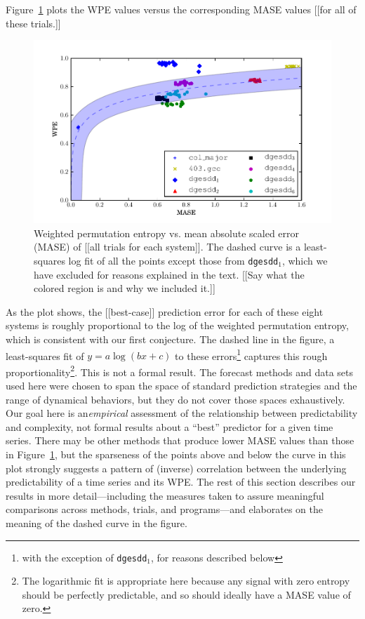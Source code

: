 Figure~\ref{fig:wpe_vs_mase_best} plots the WPE values versus the
corresponding MASE values [[for all of these trials.]]
\begin{figure}[htbp]
  \centering
  \includegraphics[width=\columnwidth]{figs/new_prediction_vs_entropy_autolog}
  \caption{Weighted permutation entropy vs. mean absolute scaled error
    (MASE) of [[all trials for each system]].
%
%
The dashed curve is a least-squares log fit of all the points except
those from {\tt dgesdd$_1$}, which we have excluded for reasons
explained in the text.  [[Say what the colored region is and why we
    included it.]]}
  \label{fig:wpe_vs_mase_best}
\end{figure}
As the plot shows, the [[best-case]] prediction error for each of
these eight systems is roughly proportional to the log of the weighted
permutation entropy, which is consistent with our first conjecture.
The dashed line in the figure, a least-squares fit of $y = a \log(b x
+ c)$ to these errors\footnote{with the exception of {\tt dgesdd$_1$},
  for reasons described below} captures this rough
proportionality\footnote{The logarithmic fit is appropriate here
  because any signal with zero entropy should be perfectly
  predictable, and so should ideally have a MASE value of zero.}.
This is not a formal result.  The forecast methods and data sets used
here were chosen to span the space of standard prediction strategies
and the range of dynamical behaviors, but they do not cover those
spaces exhaustively.  Our goal here is an\emph{empirical} assessment
of the relationship between predictability and complexity, not formal
results about a ``best'' predictor for a given time series.  There may
be other methods that produce lower MASE values than those in
Figure~\ref{fig:wpe_vs_mase_best}, but the sparseness of the points
above and below the curve in this plot strongly suggests a pattern of
(inverse) correlation between the underlying predictability of a time
series and its WPE.  The rest of this section describes our results in
more detail---including the measures taken to assure meaningful
comparisons across methods, trials, and programs---and elaborates on
the meaning of the dashed curve in the figure.

